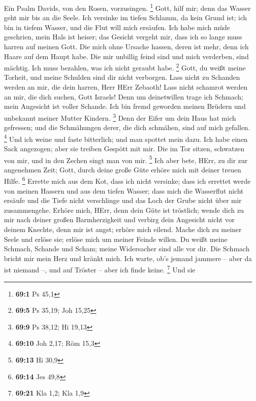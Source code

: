  Ein Psalm Davids, von den Rosen, vorzusingen. \footnote{\textbf{69:1}
  Ps 45,1}  Gott, hilf mir; denn das Wasser geht mir bis an
die Seele.  Ich versinke im tiefen Schlamm, da kein Grund
ist; ich bin in tiefem Wasser, und die Flut will mich ersäufen.
 Ich habe mich müde geschrien, mein Hals ist heiser; das
Gesicht vergeht mir, dass ich so lange muss harren auf meinen Gott.
 Die mich ohne Ursache hassen, deren ist mehr, denn ich
Haare auf dem Haupt habe. Die mir unbillig feind sind und mich
verderben, sind mächtig. Ich muss bezahlen, was ich nicht geraubt habe.
\footnote{\textbf{69:5} Ps 35,19; Joh 15,25}  Gott, du weißt
meine Torheit, und meine Schulden sind dir nicht verborgen. 
Lass nicht zu Schanden werden an mir, die dein harren, Herr HErr
Zebaoth! Lass nicht schamrot werden an mir, die dich suchen, Gott
Israels!  Denn um deinetwillen trage ich Schmach; mein
Angesicht ist voller Schande.  Ich bin fremd geworden meinen
Brüdern und unbekannt meiner Mutter Kindern. \footnote{\textbf{69:9} Ps
  38,12; Hi 19,13}  Denn der Eifer um dein Haus hat mich
gefressen; und die Schmähungen derer, die dich schmähen, sind auf mich
gefallen. \footnote{\textbf{69:10} Joh 2,17; Röm 15,3}  Und
ich weine und faste bitterlich; und man spottet mein dazu. 
Ich habe einen Sack angezogen; aber sie treiben Gespött mit mir.
 Die im Tor sitzen, schwatzen von mir, und in den Zechen
singt man von mir. \footnote{\textbf{69:13} Hi 30,9}  Ich
aber bete, HErr, zu dir zur angenehmen Zeit; Gott, durch deine große
Güte erhöre mich mit deiner treuen Hilfe. \footnote{\textbf{69:14} Jes
  49,8}  Errette mich aus dem Kot, dass ich nicht versinke;
dass ich errettet werde von meinen Hassern und aus dem tiefen Wasser;
 dass mich die Wasserflut nicht ersäufe und die Tiefe nicht
verschlinge und das Loch der Grube nicht über mir zusammengehe.
 Erhöre mich, HErr, denn dein Güte ist tröstlich; wende
dich zu mir nach deiner großen Barmherzigkeit  und verbirg
dein Angesicht nicht vor deinem Knechte, denn mir ist angst; erhöre mich
eilend.  Mache dich zu meiner Seele und erlöse sie; erlöse
mich um meiner Feinde willen.  Du weißt meine Schmach,
Schande und Scham; meine Widersacher sind alle vor dir. 
Die Schmach bricht mir mein Herz und kränkt mich. Ich warte, ob's jemand
jammere -- aber da ist niemand --, und auf Tröster -- aber ich finde
keine. \footnote{\textbf{69:21} Kla 1,2; Kla 1,9}  Und sie
